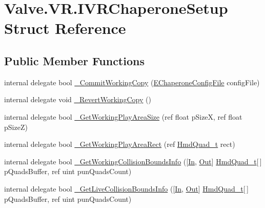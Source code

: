 \hypertarget{struct_valve_1_1_v_r_1_1_i_v_r_chaperone_setup}{}\section{Valve.\+V\+R.\+I\+V\+R\+Chaperone\+Setup Struct Reference}
\label{struct_valve_1_1_v_r_1_1_i_v_r_chaperone_setup}
\subsection*{Public Member Functions}
\begin{DoxyCompactItemize}
\item 
internal delegate bool \mbox{\hyperlink{struct_valve_1_1_v_r_1_1_i_v_r_chaperone_setup_ac4530ff8627eb38c16abc251b5f81249}{\+\_\+\+Commit\+Working\+Copy}} (\mbox{\hyperlink{namespace_valve_1_1_v_r_a9d16676419221d1177d39fe862e1f7d1}{E\+Chaperone\+Config\+File}} config\+File)
\item 
internal delegate void \mbox{\hyperlink{struct_valve_1_1_v_r_1_1_i_v_r_chaperone_setup_a236b48bec2b3c4a19ff1ea4853cc42a2}{\+\_\+\+Revert\+Working\+Copy}} ()
\item 
internal delegate bool \mbox{\hyperlink{struct_valve_1_1_v_r_1_1_i_v_r_chaperone_setup_ae1ab92ef98c104266da4a83086d96eb9}{\+\_\+\+Get\+Working\+Play\+Area\+Size}} (ref float p\+SizeX, ref float p\+SizeZ)
\item 
internal delegate bool \mbox{\hyperlink{struct_valve_1_1_v_r_1_1_i_v_r_chaperone_setup_a9d45f0e7a33aec365ddc6836942a453a}{\+\_\+\+Get\+Working\+Play\+Area\+Rect}} (ref \mbox{\hyperlink{struct_valve_1_1_v_r_1_1_hmd_quad__t}{Hmd\+Quad\+\_\+t}} rect)
\item 
internal delegate bool \mbox{\hyperlink{struct_valve_1_1_v_r_1_1_i_v_r_chaperone_setup_ad1822f8ee3c4421e27175ae83ca0c7d9}{\+\_\+\+Get\+Working\+Collision\+Bounds\+Info}} (\mbox{[}\mbox{\hyperlink{namespace_valve_1_1_v_r_a1e6192cb5ddaf204afab87ccb5728780aefeb369cccbd560588a756610865664c}{In}}, \mbox{\hyperlink{namespace_valve_1_1_v_r_a1e6192cb5ddaf204afab87ccb5728780a7c147cda9e49590f6abe83d118b7353b}{Out}}\mbox{]} \mbox{\hyperlink{struct_valve_1_1_v_r_1_1_hmd_quad__t}{Hmd\+Quad\+\_\+t}}\mbox{[}$\,$\mbox{]} p\+Quads\+Buffer, ref uint pun\+Quads\+Count)
\item 
internal delegate bool \mbox{\hyperlink{struct_valve_1_1_v_r_1_1_i_v_r_chaperone_setup_a1f35059b49dd3cdeee5e782176b0d086}{\+\_\+\+Get\+Live\+Collision\+Bounds\+Info}} (\mbox{[}\mbox{\hyperlink{namespace_valve_1_1_v_r_a1e6192cb5ddaf204afab87ccb5728780aefeb369cccbd560588a756610865664c}{In}}, \mbox{\hyperlink{namespace_valve_1_1_v_r_a1e6192cb5ddaf204afab87ccb5728780a7c147cda9e49590f6abe83d118b7353b}{Out}}\mbox{]} \mbox{\hyperlink{struct_valve_1_1_v_r_1_1_hmd_quad__t}{Hmd\+Quad\+\_\+t}}\mbox{[}$\,$\mbox{]} p\+Quads\+Buffer, ref uint pun\+Quads\+Count)

\end{DoxyCompactItemize}
